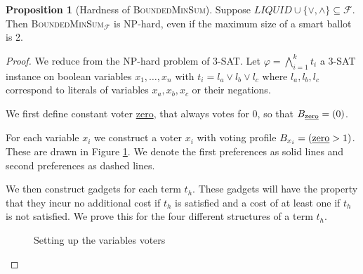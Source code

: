 \documentclass[11pt,a4paper, titlepage]{article}
\theoremstyle{definition}
\newtheorem{proposition}[theorem]{Proposition}
\begin{document}
\begin{proposition}[Hardness of \textsc{BoundedMinSum}]
    Suppose $\mathit{LIQUID} \cup \{\lor, \land\} \subseteq \mathcal{F}$. Then \textsc{BoundedMinSum}$_\mathcal{F}$ is NP-hard, even if the maximum size of a smart ballot is 2.    
\end{proposition}

\begin{proof}
    We reduce from the NP-hard problem of \textsc{3-SAT}.
    Let $\varphi = \bigwedge_{i = 1}^k t_i $ a \textsc{3-SAT} instance on boolean variables $x_1, \ldots, x_n$ with $t_i = l_a \lor l_b \lor l_c $ where $l_a, l_b, l_c$ correspond to literals of variables $x_a, x_b, x_c$ or their negations.
    
    We first define constant voter \underline{zero}, that always votes for 0, so that $B_{\text{\underline{zero}}} = (0)$.


For each variable $x_i$ we construct a voter $x_i$ with voting profile $B_{x_i} = (  \text{\underline{zero}} > 1) $. These are drawn in Figure \ref{fig:votes}. We denote the first preferences as solid lines and second preferences as dashed lines.


We then construct gadgets for each term $t_h$. 
These gadgets will have the property that they incur no additional cost if $t_h$ is satisfied and a cost of at least one if $t_h$ is not satisfied. We prove this for the four different structures of a term $t_h$.

\begin{figure}
    \centering
    \qquad
    \caption{Setting up the variables voters}
    \label{fig:votes}
\end{figure}


\end{proof}
\end{document}
